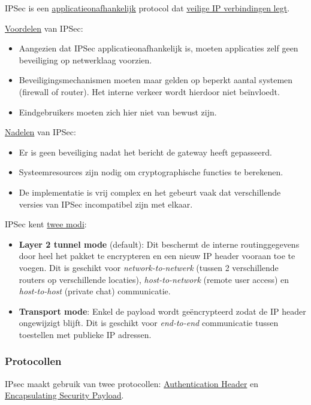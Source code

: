 \documentclass{report}
\begin{document}
	IPSec is een \underline{applicatieonafhankelijk} protocol dat \underline{veilige IP verbindingen legt}. 

	\underline{Voordelen} van IPSec:
	\begin{itemize}
		\item Aangezien dat IPSec applicatieonafhankelijk is, moeten applicaties zelf geen beveiliging op netwerklaag voorzien.
		\item Beveiligingsmechanismen moeten maar gelden op beperkt aantal systemen (firewall of router). Het interne verkeer wordt hierdoor niet beïnvloedt.
		\item Eindgebruikers moeten zich hier niet van bewust zijn.
	\end{itemize}

	\underline{Nadelen} van IPSec:
	\begin{itemize}
		\item Er is geen beveiliging nadat het bericht de gateway heeft gepasseerd.
		\item Systeemresources zijn nodig om cryptographische functies te berekenen.
		\item De implementatie is vrij complex en het gebeurt vaak dat verschillende versies van IPSec incompatibel zijn met elkaar.
	\end{itemize}

	IPSec kent \underline{twee modi}:
	\begin{itemize}
		\item \textbf{Layer 2 tunnel mode} (default): Dit beschermt de interne routinggegevens door heel het pakket te encrypteren en een nieuw IP header vooraan toe te voegen. Dit is geschikt voor \emph{network-to-netwerk} (tussen 2 verschillende routers op verschillende locaties), \emph{host-to-network} (remote user access) en \emph{host-to-host} (private chat) communicatie.
		\item \textbf{Transport mode}:  Enkel de payload wordt geëncrypteerd zodat de IP header ongewijzigt blijft. Dit is geschikt voor \emph{end-to-end} communicatie tussen toestellen met publieke IP adressen.
	\end{itemize}
	
	\subsubsection{Protocollen}
	IPsec maakt gebruik van twee protocollen: \underline{Authentication Header} en \underline{Encapsulating Security Payload}.
\end{document}
